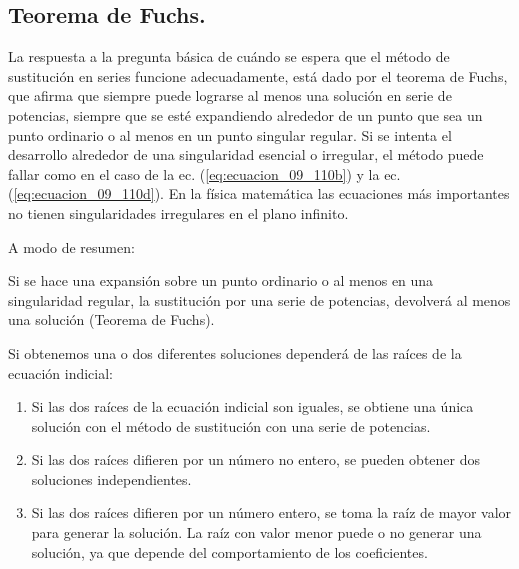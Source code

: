 \subsection*{Teorema de Fuchs.}
La respuesta a la pregunta básica de cuándo se espera que el método de sustitución en series funcione adecuadamente, está dado por el teorema de Fuchs, que afirma que siempre puede lograrse al menos una solución en serie de potencias, siempre que se esté expandiendo alrededor de un punto que sea un punto ordinario o al menos en un punto singular regular. Si se intenta el desarrollo alrededor de  una singularidad esencial o irregular, el método puede fallar como en el caso de la ec. (\ref{eq:ecuacion_09_110b}) y la ec. (\ref{eq:ecuacion_09_110d}). En la física matemática las ecuaciones más importantes no tienen singularidades irregulares en el plano infinito.
\par
A modo de resumen:
\par
Si se hace una expansión sobre un punto ordinario o al menos en una singularidad regular, la sustitución por una serie de potencias, devolverá al menos una solución (Teorema de Fuchs).
\par
Si obtenemos una o dos diferentes soluciones dependerá de las raíces de la ecuación indicial:
\begin{enumerate}
\item Si las dos raíces de la ecuación indicial son iguales, se obtiene una única solución con el método de sustitución con una serie de potencias.
\item Si las dos raíces difieren por un número no entero, se pueden obtener dos soluciones independientes.
\item Si las dos raíces difieren por un número entero, se toma la raíz de mayor valor para generar la solución. La raíz con valor menor puede o no generar una solución, ya que depende del comportamiento de los coeficientes.
\end{enumerate}
